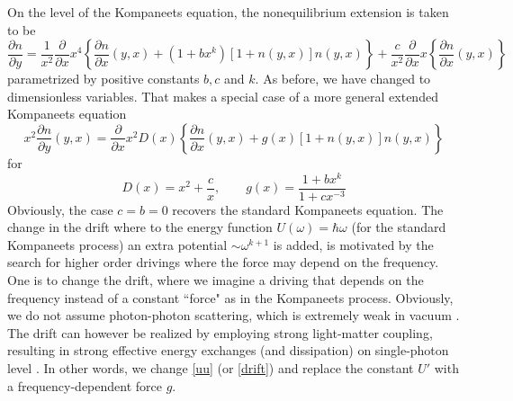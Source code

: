\documentclass[a4paper,12pt,reqno,superscriptaddress,nofootinbib]{revtex4}
\theoremstyle{plain}
\theoremstyle{definition}
\theoremstyle{remark}
\newcommand{\0}{^{(0)}}
\newcommand{\1}{^{(1)}}
\newcommand{\2}{^{(2)}}
\begin{document}
On the level of the Kompaneets equation, the nonequilibrium extension is taken to be
\begin{equation}\label{extk}
\frac{\partial n}{\partial y}=\frac{1}{x^2}\frac{\partial}{\partial x} x^4 \left\{  \frac{\partial n}{\partial x} (y,x) +  (1+bx^k)[1+n(y,x)]n(y,x)\right\} + \frac{c}{x^2}\frac{\partial}{\partial x} x \left\{  \frac{\partial n}{\partial x} (y,x)\right\}
\end{equation}
parametrized by positive constants $b,c$ and $k$.
As before, we have changed to dimensionless variables.  That makes a special case of a more general extended Kompaneets equation
\begin{equation}\label{aeke}
	x^2 \frac{\partial n}{\partial y}(y,x) = \frac{\partial}{\partial x} x^2 D(x)\left\{  \frac{\partial n}{\partial x} (y,x) +  g(x)[1+n(y,x)]n(y,x)\right\}
\end{equation}
for
 \begin{equation}\label{ext-dri}
D(x)= x^2 + \frac c{x},\qquad  g(x)=\frac{1 + bx^k}{1+cx^{-3}}
\end{equation}
Obviously, the case $c=b=0$ recovers the standard Kompaneets equation.  
The change in the drift where to the energy function $U(\omega) = \hbar\omega$ (for the standard Kompaneets process) an extra potential $\sim \omega^{k+1}$ is added, is motivated by the search for higher order drivings where the force  may depend on the frequency. One is to change the drift, where we imagine a driving that depends on the frequency instead of a constant ``force" as in the Kompaneets process.  Obviously, we do not assume photon-photon scattering, which is extremely weak in vacuum \cite{silveira}. The drift can however be realized by employing strong light-matter coupling, resulting in strong effective energy exchanges (and dissipation) on single-photon level \cite{roy2}.  In other words, we change \eqref{uu}  (or \eqref{drift}) and replace the constant $U'$ with a frequency-dependent force $g$.\\
\end{document}
